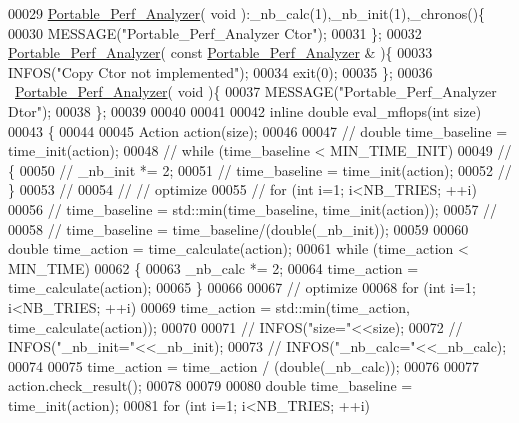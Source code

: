 \begin{DoxyCode}
00029   \hyperlink{class_portable___perf___analyzer}{Portable\_Perf\_Analyzer}( \textcolor{keywordtype}{void} ):\_nb\_calc(1),\_nb\_init(1),\_chronos()\{
00030     MESSAGE(\textcolor{stringliteral}{"Portable\_Perf\_Analyzer Ctor"});
00031   \};
00032   \hyperlink{class_portable___perf___analyzer}{Portable\_Perf\_Analyzer}( \textcolor{keyword}{const} \hyperlink{class_portable___perf___analyzer}{Portable\_Perf\_Analyzer} & )\{
00033     INFOS(\textcolor{stringliteral}{"Copy Ctor not implemented"});
00034     exit(0);
00035   \};
00036   ~\hyperlink{class_portable___perf___analyzer}{Portable\_Perf\_Analyzer}( \textcolor{keywordtype}{void} )\{
00037     MESSAGE(\textcolor{stringliteral}{"Portable\_Perf\_Analyzer Dtor"});
00038   \};
00039 
00040 
00041 
00042   \textcolor{keyword}{inline} \textcolor{keywordtype}{double} eval\_mflops(\textcolor{keywordtype}{int} size)
00043   \{
00044 
00045     Action action(size);
00046 
00047 \textcolor{comment}{//     double time\_baseline = time\_init(action);}
00048 \textcolor{comment}{//     while (time\_baseline < MIN\_TIME\_INIT)}
00049 \textcolor{comment}{//     \{}
00050 \textcolor{comment}{//       \_nb\_init *= 2;}
00051 \textcolor{comment}{//       time\_baseline = time\_init(action);}
00052 \textcolor{comment}{//     \}}
00053 \textcolor{comment}{//}
00054 \textcolor{comment}{//     // optimize}
00055 \textcolor{comment}{//     for (int i=1; i<NB\_TRIES; ++i)}
00056 \textcolor{comment}{//       time\_baseline = std::min(time\_baseline, time\_init(action));}
00057 \textcolor{comment}{//}
00058 \textcolor{comment}{//     time\_baseline = time\_baseline/(double(\_nb\_init));}
00059 
00060     \textcolor{keywordtype}{double} time\_action = time\_calculate(action);
00061     \textcolor{keywordflow}{while} (time\_action < MIN\_TIME)
00062     \{
00063       \_nb\_calc *= 2;
00064       time\_action = time\_calculate(action);
00065     \}
00066 
00067     \textcolor{comment}{// optimize}
00068     \textcolor{keywordflow}{for} (\textcolor{keywordtype}{int} i=1; i<NB\_TRIES; ++i)
00069       time\_action = std::min(time\_action, time\_calculate(action));
00070 
00071 \textcolor{comment}{//     INFOS("size="<<size);}
00072 \textcolor{comment}{//     INFOS("\_nb\_init="<<\_nb\_init);}
00073 \textcolor{comment}{//     INFOS("\_nb\_calc="<<\_nb\_calc);}
00074 
00075     time\_action = time\_action / (double(\_nb\_calc));
00076 
00077     action.check\_result();
00078 
00079 
00080     \textcolor{keywordtype}{double} time\_baseline = time\_init(action);
00081     \textcolor{keywordflow}{for} (\textcolor{keywordtype}{int} i=1; i<NB\_TRIES; ++i)

\end{DoxyCode}
